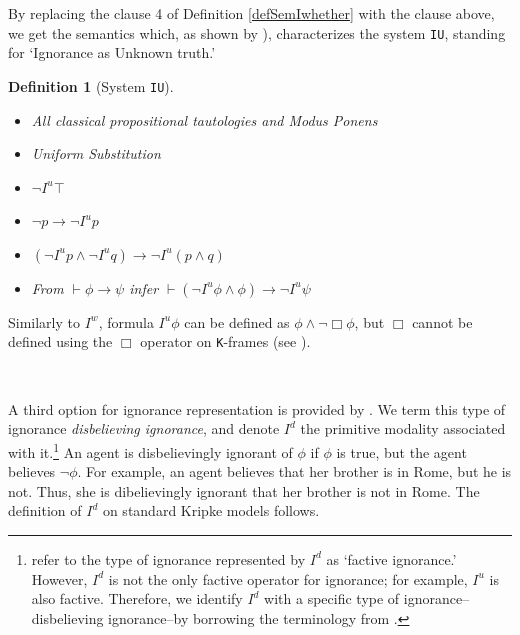 \documentclass{article}
\newtheorem{defi}{Definition}
\begin{document}
By replacing the clause 4 of Definition \ref{defSemIwhether} with the clause above, we get the semantics which, as shown by \cite{Fan2015a}), characterizes the system \texttt{IU}, standing for `Ignorance as Unknown truth.'


\begin{defi}[System \texttt{IU}]

\

\begin{itemize}

\item[(CPL)] All classical propositional tautologies and Modus Ponens

\item[(US)] Uniform Substitution

\item[(A1$_{IU}$)] $\neg I^{u} \top$

\item[(A2$_{IU}$)] $\neg p \rightarrow \neg I^{u} p$

\item[(A3$_{IU}$)] $(\neg I^{u} p \wedge \neg I^{u} q) \rightarrow \neg I^{u}(p \wedge q)$

\item[(R$_{IU}$)] From $\vdash \phi \rightarrow \psi$ infer $\vdash (\neg I^{u} \phi \wedge \phi) \rightarrow \neg I^{u} \psi$

\end{itemize}

\end{defi}

Similarly to $I^{w}$, formula $I^{u} \phi$ can be defined as $\phi \wedge \neg \Box \phi$, but $\Box$ cannot be defined using the $\Box$ operator on \texttt{K}-frames (see \citet{Gilbert2016}).

\

A third option for ignorance representation is provided by \citet{Kubyshkina2021}. We term this type of ignorance \textit{disbelieving ignorance}, and denote $I^{d}$ the primitive modality associated with it.\footnote{\citet{Kubyshkina2021} refer to the type of ignorance represented by $I^{d}$ as `factive ignorance.' However, $I^{d}$ is not the only factive operator for ignorance; for example, $I^{u}$ is also factive. Therefore, we identify $I^{d}$ with a specific type of ignorance--disbelieving ignorance--by borrowing the terminology from \citep{Peels2020}.} An agent is disbelievingly ignorant of $\phi$ if $\phi$ is true, but the agent believes $\neg \phi$. For example, an agent believes that her brother is in Rome, but he is not. Thus, she is dibelievingly ignorant that her brother is not in Rome. The definition of $I^{d}$ on standard Kripke models follows.
\end{document}
